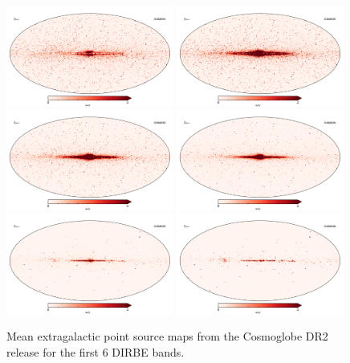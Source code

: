 \documentclass{aa}
\begin{document}
\begin{figure}
  \centering
  \includegraphics[width=0.49\textwidth]{figs/starmaps/ptsrc_mean_01.pdf}
  \includegraphics[width=0.49\textwidth]{figs/starmaps/ptsrc_mean_02.pdf} \\
  \includegraphics[width=0.49\textwidth]{figs/starmaps/ptsrc_mean_03.pdf}
  \includegraphics[width=0.49\textwidth]{figs/starmaps/ptsrc_mean_04.pdf} \\
  \includegraphics[width=0.49\textwidth]{figs/starmaps/ptsrc_mean_05.pdf}
  \includegraphics[width=0.49\textwidth]{figs/starmaps/ptsrc_mean_06.pdf} \\
  \caption{Mean extragalactic point source maps from the Cosmoglobe DR2 release for the first 6 DIRBE bands. }
  \label{fig:exgalT}
\end{figure}
\end{document}
